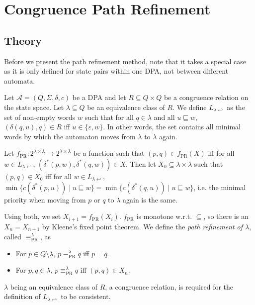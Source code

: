 
\chapter{Congruence Path Refinement}
\label{chap:pr}

\section{Theory}

Before we present the path refinement method, note that it takes a special case as it is only defined for state pairs within one DPA, not between different automata.

\begin{defn}
	Let $\mathcal{A} = (Q, \Sigma, \delta, c)$ be a DPA and let $R \subseteq Q \times Q$ be a congruence relation on the state space. Let $\lambda \subseteq Q$ be an equivalence class of $R$. We define $L_{\lambda \hookleftarrow}$ as the set of non-empty words $w$ such that for all $q \in \lambda$ and all $u \sqsubseteq w$, $(\delta(q, u), q) \in R$ iff $u \in \{\varepsilon, w\}$. In other words, the set contains all minimal words by which the automaton moves from $\lambda$ to $\lambda$ again.
	
	Let $f_\text{PR} : 2^{\lambda \times \lambda} \rightarrow 2^{\lambda \times \lambda}$ be a function such that $(p, q) \in f_\text{PR}(X)$  iff for all $w \in L_{\lambda \hookleftarrow}$, $(\delta^*(p, w), \delta^*(q, w)) \in X$.
	Then let $X_0 \subseteq \lambda \times \lambda$ such that $(p, q) \in X_0$ iff for all $w \in L_{\lambda \hookleftarrow}$, $\min \{ c(\delta^*(p, u)) \mid u \sqsubseteq w \} = \min \{ c(\delta^*(q, u)) \mid u \sqsubseteq w \}$, i.e. the minimal priority when moving from $p$ or $q$ to $\lambda$ again is the same.
	
	Using both, we set $X_{i+1} = f_\text{PR}(X_i)$. $f_\text{PR}$ is monotone w.r.t. $\subseteq$, so there is an $X_n = X_{n+1}$ by Kleene's fixed point theorem. We define the \emph{path refinement of $\lambda$}, called $\equiv_\text{PR}^\lambda$, as
	\begin{itemize}
		\item For $p \in Q \setminus \lambda$, $p \equiv_\text{PR}^\lambda q$ iff $p = q$.
		\item For $p, q \in \lambda$, $p \equiv_\text{PR}^\lambda q$ iff $(p, q) \in X_n$.
	\end{itemize}
\end{defn}

$\lambda$ being an equivalence class of $R$, a congruence relation, is required for the definition of $L_{\lambda \hookleftarrow}$ to be consistent.

